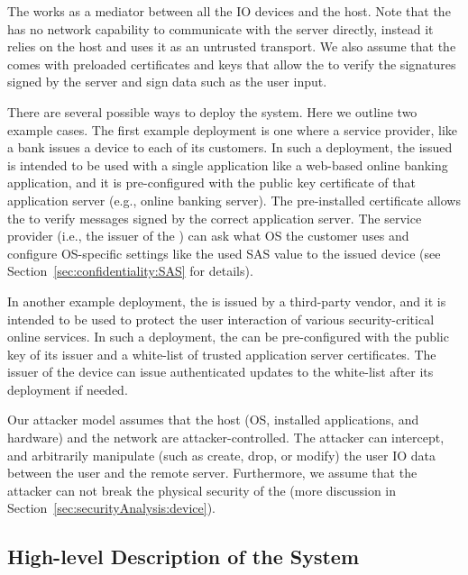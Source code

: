 The \device works as a mediator between all the IO devices and the host. Note that the \device has no network capability to communicate with the server directly, instead it relies on the host and uses it as an untrusted transport. We also assume that the \device comes with preloaded certificates and keys that allow the \device to verify the signatures signed by the server and sign data such as the user input.

There are several possible ways to deploy the \name system. Here we outline two example cases. The first example deployment is one where a service provider, like a bank issues a \device device to each of its customers. In such a deployment, the issued \device is intended to be used with a single application like a web-based online banking application, and it is pre-configured with the public key certificate of that application server (e.g., online banking server). The pre-installed certificate allows the \device to verify messages signed by the correct application server. The service provider (i.e., the issuer of the \device) can ask what OS the customer uses and configure OS-specific settings like the used SAS value to the issued device (see Section~\ref{sec:confidentiality:SAS} for details). 

In another example deployment, the \device is issued by a third-party vendor, and it is intended to be used to protect the user interaction of various security-critical online services. In such a deployment, the \device can be pre-configured with the public key of its issuer and a white-list of trusted application server certificates. The issuer of the device can issue authenticated updates to the white-list after its deployment if needed.

 Our attacker model assumes that the host (OS, installed applications, and hardware) and the network are attacker-controlled. The attacker can intercept, and arbitrarily manipulate (such as create, drop, or modify) the user IO data between the user and the remote server. Furthermore, we assume that the attacker can not break the physical security of the \device (more discussion in Section~\ref{sec:securityAnalysis:device}).
 


\subsection{High-level Description of the System}

